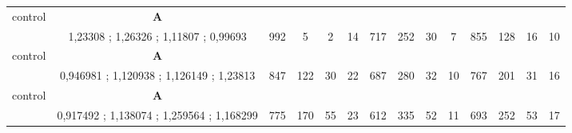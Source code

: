 \begin{table}[]
{\begin{tabular}{|c|c|c|c|c|c|c|c|c|c|c|c|c|c|}
control & \cellcolor{blue!15}\textbf{A}& {\color[HTML]{00009B} } & {\color[HTML]{9A0000} } & {\color[HTML]{009901} } &  & {\color[HTML]{00009B} } & {\color[HTML]{9A0000} } & {\color[HTML]{009901} } &  & {\color[HTML]{00009B} } & {\color[HTML]{9A0000} } & {\color[HTML]{009901} } &  \\ 
 & \cellcolor{ blue!15}1,23308 ; 1,26326 ; 1,11807 ; 0,99693 & \multirow{-2}{*}{{\color[HTML]{00009B} 992}} & \multirow{-2}{*}{{\color[HTML]{9A0000} 5}} & \multirow{-2}{*}{{\color[HTML]{009901} 2}} & \multirow{-2}{*}{14} & \multirow{-2}{*}{{\color[HTML]{00009B} 717}} & \multirow{-2}{*}{{\color[HTML]{9A0000} 252}} & \multirow{-2}{*}{{\color[HTML]{009901} 30}} & \multirow{-2}{*}{7} & \multirow{-2}{*}{{\color[HTML]{00009B} 855}} & \multirow{-2}{*}{{\color[HTML]{9A0000} 128}} & \multirow{-2}{*}{{\color[HTML]{009901} 16}} & \multirow{-2}{*}{10} \\ \hline

control & \cellcolor{blue!15}\textbf{A}& {\color[HTML]{00009B} } & {\color[HTML]{9A0000} } & {\color[HTML]{009901} } &  & {\color[HTML]{00009B} } & {\color[HTML]{9A0000} } & {\color[HTML]{009901} } &  & {\color[HTML]{00009B} } & {\color[HTML]{9A0000} } & {\color[HTML]{009901} } &  \\ 
 & \cellcolor{ blue!15}0,946981 ; 1,120938 ; 1,126149 ; 1,23813 & \multirow{-2}{*}{{\color[HTML]{00009B} 847}} & \multirow{-2}{*}{{\color[HTML]{9A0000} 122}} & \multirow{-2}{*}{{\color[HTML]{009901} 30}} & \multirow{-2}{*}{22} & \multirow{-2}{*}{{\color[HTML]{00009B} 687}} & \multirow{-2}{*}{{\color[HTML]{9A0000} 280}} & \multirow{-2}{*}{{\color[HTML]{009901} 32}} & \multirow{-2}{*}{10} & \multirow{-2}{*}{{\color[HTML]{00009B} 767}} & \multirow{-2}{*}{{\color[HTML]{9A0000} 201}} & \multirow{-2}{*}{{\color[HTML]{009901} 31}} & \multirow{-2}{*}{16} \\ \hline

control & \cellcolor{blue!15}\textbf{A}& {\color[HTML]{00009B} } & {\color[HTML]{9A0000} } & {\color[HTML]{009901} } &  & {\color[HTML]{00009B} } & {\color[HTML]{9A0000} } & {\color[HTML]{009901} } &  & {\color[HTML]{00009B} } & {\color[HTML]{9A0000} } & {\color[HTML]{009901} } &  \\ 
 & \cellcolor{ blue!15}0,917492 ; 1,138074 ; 1,259564 ; 1,168299 & \multirow{-2}{*}{{\color[HTML]{00009B} 775}} & \multirow{-2}{*}{{\color[HTML]{9A0000} 170}} & \multirow{-2}{*}{{\color[HTML]{009901} 55}} & \multirow{-2}{*}{23} & \multirow{-2}{*}{{\color[HTML]{00009B} 612}} & \multirow{-2}{*}{{\color[HTML]{9A0000} 335}} & \multirow{-2}{*}{{\color[HTML]{009901} 52}} & \multirow{-2}{*}{11} & \multirow{-2}{*}{{\color[HTML]{00009B} 693}} & \multirow{-2}{*}{{\color[HTML]{9A0000} 252}} & \multirow{-2}{*}{{\color[HTML]{009901} 53}} & \multirow{-2}{*}{17} \\ \hline



\end{tabular}}
\end{table}
